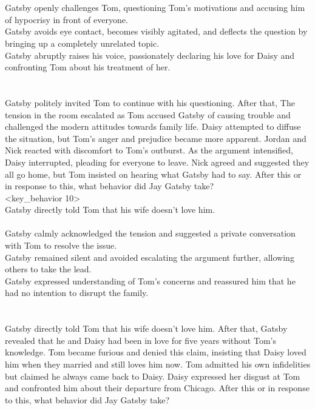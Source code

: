 \begin{tcolorbox}[title = {Behavior Chain}, breakable]
\\<distracters 9>\\
Gatsby openly challenges Tom, questioning Tom's motivations and accusing him of hypocrisy in front of everyone.\\
Gatsby avoids eye contact, becomes visibly agitated, and deflects the question by bringing up a completely unrelated topic.\\
Gatsby abruptly raises his voice, passionately declaring his love for Daisy and confronting Tom about his treatment of her.\\
\\<context 10>\\
Gatsby politely invited Tom to continue with his questioning. After that, The tension in the room escalated as Tom accused Gatsby of causing trouble and challenged the modern attitudes towards family life. Daisy attempted to diffuse the situation, but Tom's anger and prejudice became more apparent. Jordan and Nick reacted with discomfort to Tom's outburst. As the argument intensified, Daisy interrupted, pleading for everyone to leave. Nick agreed and suggested they all go home, but Tom insisted on hearing what Gatsby had to say. After this or in response to this, what behavior did Jay Gatsby take?
\\<key\_behavior 10>\\
Gatsby directly told Tom that his wife doesn't love him.
\\<distracters 10>\\
Gatsby calmly acknowledged the tension and suggested a private conversation with Tom to resolve the issue.\\
Gatsby remained silent and avoided escalating the argument further, allowing others to take the lead.\\
Gatsby expressed understanding of Tom's concerns and reassured him that he had no intention to disrupt the family.\\
\\<context 11>\\
Gatsby directly told Tom that his wife doesn't love him. After that, Gatsby revealed that he and Daisy had been in love for five years without Tom's knowledge. Tom became furious and denied this claim, insisting that Daisy loved him when they married and still loves him now. Tom admitted his own infidelities but claimed he always came back to Daisy. Daisy expressed her disgust at Tom and confronted him about their departure from Chicago. After this or in response to this, what behavior did Jay Gatsby take?

\end{tcolorbox}
